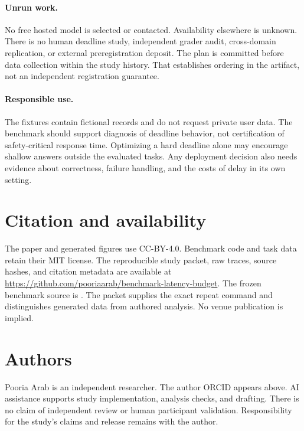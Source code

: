 \documentclass{article}
\begin{document}
\paragraph{Unrun work.} No free hosted model is selected or contacted. Availability elsewhere is unknown. There is no human deadline study, independent grader audit, cross-domain replication, or external preregistration deposit. The plan is committed before data collection within the study history. That establishes ordering in the artifact, not an independent registration guarantee.\par
\paragraph{Responsible use.} The fixtures contain fictional records and do not request private user data. The benchmark should support diagnosis of deadline behavior, not certification of safety-critical response time. Optimizing a hard deadline alone may encourage shallow answers outside the evaluated tasks. Any deployment decision also needs evidence about correctness, failure handling, and the costs of delay in its own setting.\par
\section{Citation and availability}
The paper and generated figures use CC-BY-4.0. Benchmark code and task data retain their MIT license. The reproducible study packet, raw traces, source hashes, and citation metadata are available at \url{https://github.com/pooriaarab/benchmark-latency-budget}. The frozen benchmark source is \texttt{\SourceCommit}. The packet supplies the exact repeat command and distinguishes generated data from authored analysis. No venue publication is implied.\par
\section{Authors}
Pooria Arab is an independent researcher. The author ORCID appears above. AI assistance supports study implementation, analysis checks, and drafting. There is no claim of independent review or human participant validation. Responsibility for the study's claims and release remains with the author.\par


\end{document}
